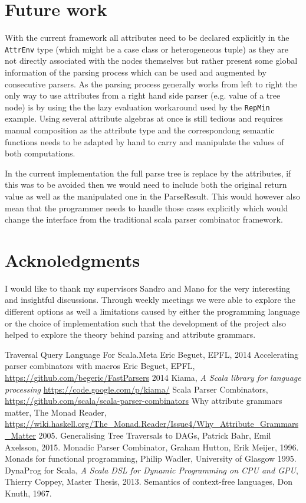 \section{Future work}
With the current framework all attributes need to be declared explicitly in the \verb/AttrEnv/ type (which might be a case class or heterogeneous tuple) as they are not directly associated with the nodes themselves but rather present some global information of the parsing process which can be used and augmented by consecutive parsers.
As the parsing process generally works from left to right the only way to use attributes from a right hand side parser (e.g. value of a tree node) is by using the the lazy evaluation workaround used by the \verb/RepMin/ example.
Using several attribute algebras at once is still tedious and requires manual composition as the attribute type and the correspondong semantic functions needs to be adapted by hand to carry and manipulate the values of both computations.

In the current implementation the full parse tree is replace by the attributes, if this was to be avoided then we would need to include both the original return value as well as the manipulated one in the ParseResult. This would however also mean that the programmer needs to handle those cases explicitly which would change the interface from the traditional scala parser combinator framework.

\section{Acknoledgments}
I would like to thank my supervisors Sandro and Mano for the very interesting and insightful discussions. Through weekly meetings we were able to explore the different options as well a limitations caused by either the programming language or the choice of implementation such that the development of the project also helped to explore the theory behind parsing and attribute grammars.

\begin{thebibliography}{9}
  Traversal Query Language For Scala.Meta
  Eric Beguet, EPFL,
  2014
  Accelerating parser combinators with macros
  Eric Beguet, EPFL,
  \url{https://github.com/begeric/FastParsers}
  2014
  Kiama,
  \emph{A Scala library for language processing}
  \url{https://code.google.com/p/kiama/}
  Scala Parser Combinators,
  \url{https://github.com/scala/scala-parser-combinators}
  Why attribute grammars matter,
  The Monad Reader,
  \url{https://wiki.haskell.org/The_Monad.Reader/Issue4/Why_Attribute_Grammars_Matter}
  2005.
  Generalising Tree Traversals to DAGs,
  Patrick Bahr, Emil Axelsson,
  2015.
  Monadic Parser Combinator,
  Graham Hutton, Erik Meijer,
  1996.
  Monads for functional programming,
  Philip Wadler, University of Glasgow
  1995.
  DynaProg for Scala,
  \emph{A Scala DSL for Dynamic Programming on CPU and GPU},
  Thierry Coppey, Master Thesis,
  2013.
  Semantics of context-free languages,
  Don Knuth,
  1967.
\end{thebibliography}
